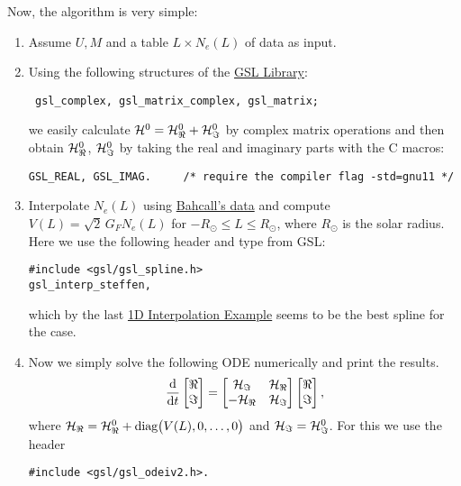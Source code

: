 \documentclass[a4paper,fleqn,12pt]{article}
\begin{document}
Now, the algorithm is very simple:
\begin{enumerate}

\item Assume $U, M$ and a table $L \times N_e(L)$ of data as input.

\item Using the following structures of the \href{https://www.gnu.org/software/gsl/doc/html/}{GSL Library}:
\begin{verbatim} gsl_complex, gsl_matrix_complex, gsl_matrix; \end{verbatim}
we easily calculate $\H^0 = \H^0_\real + \H^0_\imaginary$ by complex matrix operations and then obtain $\H^0_\real$, $\H^0_\imaginary$ by taking the real and imaginary parts with the C macros:
\begin{verbatim}
GSL_REAL, GSL_IMAG.     /* require the compiler flag -std=gnu11 */
\end{verbatim}

\item Interpolate $N_e(L)$ using \href{http://www.sns.ias.edu/~jnb/SNdata/sndata.html}{Bahcall's data} and compute $V(L) = \sqrt{2} \, G_F N_e(L)$ for $-R_\odot \leq L \leq R_\odot$, where $R_\odot$ is the solar radius. Here we use the following header and type from GSL:
\begin{verbatim}
#include <gsl/gsl_spline.h>
gsl_interp_steffen,
\end{verbatim}
which by the last \href{https://www.gnu.org/software/gsl/doc/html/interp.html#d-interpolation-example-programs}{1D Interpolation Example} seems to be the best spline for the case.

\item Now we simply solve the following ODE numerically and print the results.
$$
\dv{}{t}
\begin{bmatrix}
\real \\ \imaginary
\end{bmatrix}
=
\begin{bmatrix}
\H_\imaginary & \H_\real \\
-\H_\real & \H_\imaginary
\end{bmatrix}
\begin{bmatrix}
\real \\ \imaginary
\end{bmatrix},
$$
where $\H_\real = \H^0_\real + \text{diag}\big(V(L), 0, \ldots, 0\big)$ and $\H_\imaginary = \H^0_\imaginary$. For this we use the header
\begin{verbatim}
#include <gsl/gsl_odeiv2.h>.
\end{verbatim}

\end{enumerate}
\end{document}
